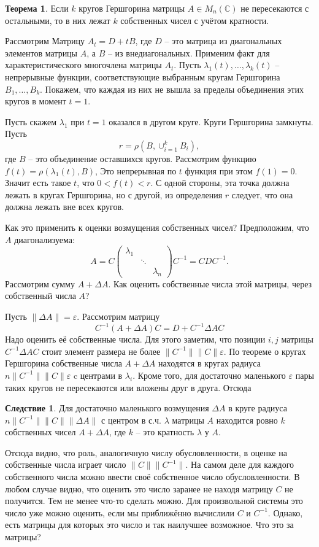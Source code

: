\documentclass[10pt,a4paper,oneside]{book}
\theoremstyle{definition}
\newtheorem{thm}{\color{red!40!black}Теорема}
\newtheorem{cor}{\color{green!45!black}Следствие}
\newcommand{\mb}[1]{\mathbb{#1}}
\def\eps{\varepsilon}
\def\thrm{\begin{thm}}
\def\ethrm{\end{thm}}
\def\crl{\begin{cor}}
\def\ecrl{\end{cor}}
\def\pmat{\begin{pmatrix}}
\def\epmat{\end{pmatrix}}
\begin{document}
\thrm Если $k$ кругов Гершгорина матрицы $A\in M_n(\mb C)$ не пересекаются с остальными, то в них лежат $k$ собственных чисел с учётом кратности.
\ethrm
\proof Рассмотрим Матрицу $A_t= D+ tB$, где $D$ -- это матрица из диагональных элементов матрицы $A$, а $B$ -- из внедиагональных. Применим факт для характеристического многочлена матрицы $A_t$. Пусть  $\lambda_1(t),\dots,\lambda_k(t)$ -- непрерывные функции, соответствующие выбранным кругам Гершгорина $B_1,\dots,B_k$. Покажем, что каждая из них не вышла за пределы объединения этих кругов в момент $t=1$. 

Пусть скажем $\lambda_1$ при $t=1$ оказался в другом круге. Круги Гершгорина замкнуты. Пусть 
$$r=\rho(B,\cup_{i=1}^k B_i),$$
где $B$ -- это объединение оставшихся кругов. Рассмотрим функцию $f(t)=\rho(\lambda_1(t),B)$,  Это непрерывная по $t$ функция при этом $f(1)=0$. Значит есть такое $t$, что $0<f(t)<r$. С одной стороны, эта точка должна лежать в кругах Гершгорина, но с другой, из определения $r$ следует, что она должна лежать вне всех кругов.  
\endproof

Как это применить к оценки возмущения собственных чисел? Предположим, что $A$ диагонализуема:
$$A=C\pmat \lambda_1 && \\ & \ddots & \\ && \lambda_n \epmat C^{-1}=CDC^{-1}.$$
Рассмотрим сумму $A+\Delta A$. Как оценить собственные числа этой матрицы, через собственный числа $A$?

Пусть $\| \Delta A\|=\eps$. Рассмотрим матрицу
$$C^{-1}(A+\Delta A) C= D+C^{-1}\Delta A C $$
Надо оценить её собственные числа. Для этого заметим, что позиции  $i,j$ матрицы $C^{-1}\Delta A C$ стоит элемент размера не более $\| C^{-1}\| \|C\| \eps$. По теореме о кругах Гершгорина собственные числа $A+\Delta A$ находятся в кругах радиуса $n \| C^{-1}\| \|C\| \eps $ c центрами в $\lambda_i$. Кроме того, для достаточно маленького $\eps$ пары таких кругов не пересекаются или вложены друг в друга. Отсюда

\crl Для достаточно маленького возмущения $\Delta A$ в круге радиуса  $n \| C^{-1}\| \|C\| \|\Delta A\|$ с центром в с.ч.  $\lambda$ матрицы $A$ находится ровно $k$ собственных чисел $A+\Delta A$, где $k$ -- это кратность $\lambda$ у $A$.
\ecrl

Отсюда видно, что  роль, аналогичную числу обусловленности, в оценке на собственные числа играет число $\|C\|\|C^{-1}\|$. На самом деле для каждого собственного числа можно ввести своё собственное число обусловленности. В любом случае видно, что оценить это число заранее не находя матрицу $C$ не получится. Тем не менее что-то сделать можно. Для произвольной системы это число уже можно оценить, если мы приближённо вычислили $C$ и $C^{-1}$. Однако, есть матрицы для которых это число и так наилучшее возможное. Что это за матрицы?
\end{document}

